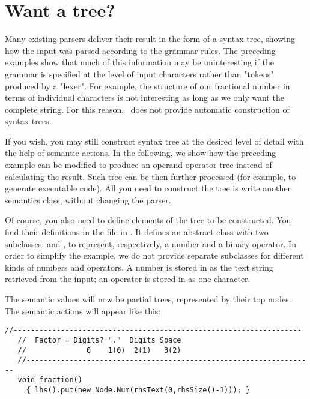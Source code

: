 
\section{Want a tree?\label{tree}}


Many existing parsers deliver their result in the form of a syntax tree,
showing how the input was parsed according to the grammar rules.
The preceding examples show that much of this information may be
uninteresting if the grammar is specified at the level
of input characters rather than "tokens" produced by a "lexer".
For example, the structure of our fractional number 
in terms of individual characters is not interesting 
as long as we only want the complete string.
For this reason, \Mouse\ does not provide automatic construction
of syntax trees.

If you wish, you may still construct syntax tree at the desired level of detail
with the help of semantic actions.
In the following, we show how the preceding example
can be modified to produce an operand-operator tree
instead of calculating the result.
Such tree can be then further processed
(for example, to generate executable code).
All you need to construct the tree is write another semantics class,
without changing the parser.

Of course, you also need to define elements of the tree to be constructed.
You find their definitions in the file  in .
It defines an abstract class  with two subclasses:
 and ,
to represent, respectively, a number 
and a binary operator.
%
In order to simplify the example, we do not provide separate subclasses
for different kinds of numbers and operators.
A number is stored in  as the text string retrieved from the input;
an operator is stored in  as one character.

The semantic values will now be partial trees, represented by their top nodes.
The semantic actions will appear like this:

\small
\begin{Verbatim}[frame=single,framesep=2mm,samepage=true,xleftmargin=15mm,xrightmargin=15mm,baselinestretch=0.8]
   //-------------------------------------------------------------------
   //  Factor = Digits? "."  Digits Space
   //              0    1(0)  2(1)   3(2)
   //-------------------------------------------------------------------
   void fraction()
     { lhs().put(new Node.Num(rhsText(0,rhsSize()-1))); }
\end{Verbatim}
\normalsize

